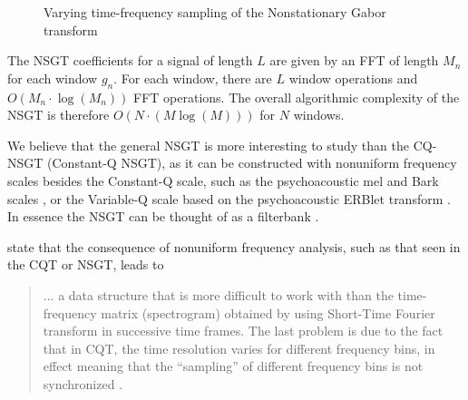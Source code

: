 \documentclass[report.tex]{subfiles}
\begin{document}
\begin{figure}[ht]
	\centering
	\hspace{1em}
	\caption{Varying time-frequency sampling of the Nonstationary Gabor transform \parencite[1,485, 1,487]{balazs}}
	\label{fig:nonuniformtflattices}
\end{figure}

The NSGT coefficients for a signal of length $L$ are given by an FFT of length $M_{n}$ for each window $g_{n}$. For each window, there are $L$ window operations and $O(M_{n} \cdot \log(M_{n}))$ FFT operations. The overall algorithmic complexity of the NSGT is therefore $O(N \cdot (M \log(M)))$ for $N$ windows.

We believe that the general NSGT is more interesting to study than the CQ-NSGT (Constant-Q NSGT), as it can be constructed with nonuniform frequency scales besides the Constant-Q scale, such as the psychoacoustic mel and Bark scales \parencite{melbook}, or the Variable-Q scale based on the psychoacoustic ERBlet transform \parencite{variableq1, variableq2}. In essence the NSGT can be thought of as a filterbank \parencite{variableq1}. 

\citeauthor{klapuricqt} state that the consequence of nonuniform frequency analysis, such as that seen in the CQT or NSGT, leads to
\begin{quote}
	... a data structure that is more difficult to work with than the time-frequency matrix (spectrogram) obtained by using Short-Time Fourier transform in successive time frames. The last problem is due to the fact that in CQT, the time resolution varies for different frequency bins, in effect meaning that the ``sampling'' of different frequency bins is not synchronized \parencite[1]{klapuricqt}.
\end{quote}
\end{document}
